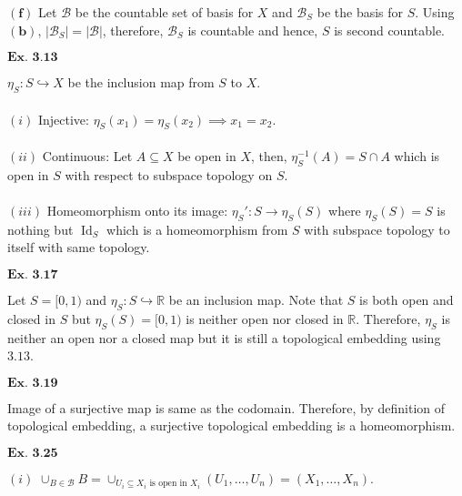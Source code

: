 \documentclass{article}
\begin{document}
$\mathbf{(f)}$ Let $\mathcal{B}$ be the countable set of basis for $X$ and $\mathcal{B}_S$ be the basis for $S$. Using $\mathbf{(b)}$, $|\mathcal{B}_S| = |\mathcal{B}|$, therefore, $\mathcal{B}_S$ is countable and hence, $S$ is second countable.

\vspace{0.2in}

${\textbf{Ex. 3.13}}$

$\eta_{S}:S\hookrightarrow X$ be the inclusion map from $S$ to $X$.\\~\\

$(i)$ Injective: $\eta_S(x_1) = \eta_S(x_2) \implies x_1 = x_2$.\\~\\

$(ii)$ Continuous: Let $A \subseteq X$ be open in $X$, then, $\eta_{S}^{-1}(A) = S \cap A$ which is open in $S$ with respect to subspace topology on $S$.\\~\\

$(iii)$ Homeomorphism onto its image: $\eta_{S}':S\rightarrow \eta_{S}(S)$ where $\eta_{S}(S) = S$ is nothing but $\operatorname{Id}_{S}$ which is a homeomorphism from $S$ with subspace topology to itself with same topology.   

\vspace{0.2in}

${\textbf{Ex. 3.17}}$

Let $S = [0,1)$ and $\eta_{S}:S \hookrightarrow \mathbb{R}$ be an inclusion map. Note that $S$ is both open and closed in $S$ but $\eta_{S}(S) = [0,1)$ is neither open nor closed in $\mathbb{R}$. Therefore, $\eta_{S}$ is neither an open nor a closed map but it is still a topological embedding using $\mathbf{3.13}$.

\vspace{0.2in}

${\textbf{Ex. 3.19}}$

Image of a surjective map is same as the codomain. Therefore, by definition of topological embedding, a surjective topological embedding is a homeomorphism.

\vspace{0.2in}

${\textbf{Ex. 3.25}}$

$(i)$ $\cup_{B \in \mathcal{B}} B = \cup_{U_i \subseteq X_i \text{ is open in }X_i}(U_1, \ldots, U_n) = (X_1, \ldots, X_n)$.\\~\\
\end{document}
